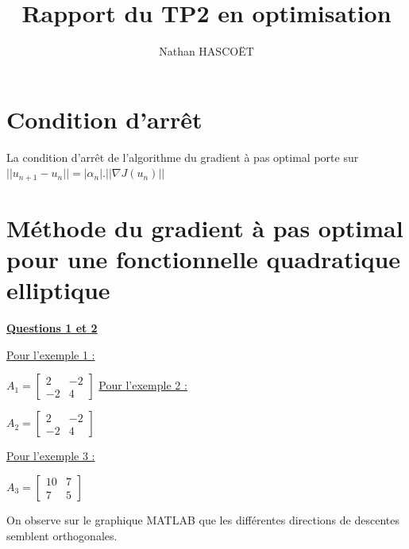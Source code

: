 \documentclass[12pt,a4paper]{article}
\author{Nathan HASCOËT}
\title{Rapport du TP2 en optimisation}
\begin{document}
	
\maketitle

\section{Condition d'arrêt}
	
	La condition d'arrêt de l'algorithme du gradient à pas optimal porte sur $|\!|u_{n+1}-u_n|\!| = |\alpha_n|.|\!|\nabla J(u_n)|\!|$
	
\section{Méthode du gradient à pas optimal pour une fonctionnelle quadratique elliptique}

	\textbf{\underline{Questions 1 et 2}}
	
	\vspace{.5cm}
	
	\underline{Pour l'exemple 1 :}
	\begin{minipage}[t]{15cm}
		$A_1 = \begin{bmatrix}
			 2 & -2 \\
			 -2 & 4
			 \end{bmatrix}$  \hspace{2cm} \underline{Pour l'exemple 2 :}
			 \begin{minipage}[t]{5cm}
			 	$A_2 = \begin{bmatrix}
			 		2 & -2 \\
			 		-2 & 4
			 	\end{bmatrix}$
			 \end{minipage}
	\end{minipage} 
	
	\vspace{.2cm}
	
	\underline{Pour l'exemple 3 :} \begin{minipage}[t]{15cm}
		$A_3 = \begin{bmatrix}
			10 & 7 \\
			7 & 5
		\end{bmatrix}$ 
	\end{minipage}
	
	\vspace{.5cm}
	
	On observe sur le graphique MATLAB que les différentes directions de descentes semblent orthogonales.\\
	
\end{document}
